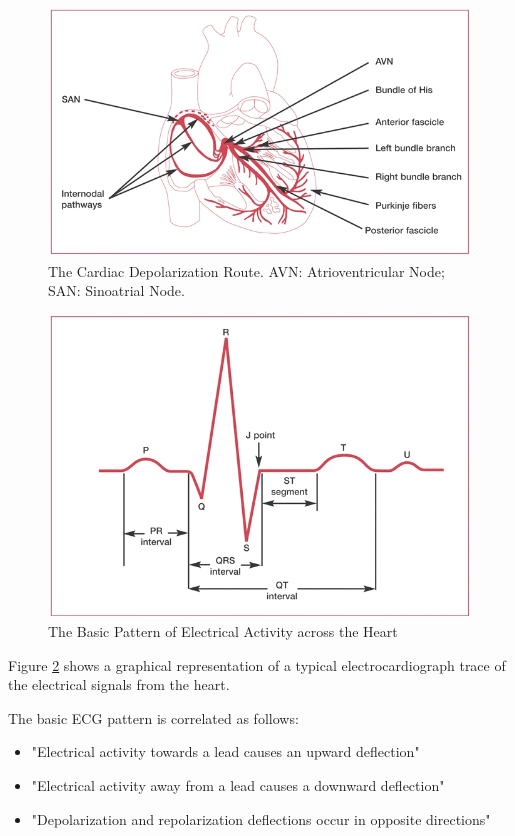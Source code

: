 \begin{figure}[H]
	\centering
	\includegraphics[width=0.7\linewidth]{ch3f3.jpg}
	\caption{The Cardiac Depolarization Route. AVN: Atrioventricular Node; SAN: Sinoatrial Node. \cite{hall2015guyton}}
	\label{cardiacdepolarization}
\end{figure}

\begin{figure}[H]
	\centering
	\includegraphics[width=0.7\linewidth]{ch3f4.jpg}
	\caption{The Basic Pattern of Electrical Activity across the Heart \cite{ashley2004conquering}}
	\label{ecgpattern}
\end{figure}

Figure \ref{ecgpattern} shows a graphical representation of a typical electrocardiograph trace of the electrical signals from the heart. 

The basic ECG pattern is correlated as follows: 

\begin{itemize}
	\item "Electrical activity towards a lead causes an upward deflection" \cite{ashley2004conquering}
	\item "Electrical activity away from a lead causes a downward deflection" \cite{ashley2004conquering} 
	\item "Depolarization and repolarization deflections occur in opposite directions" \cite{ashley2004conquering} 
\end{itemize}  

